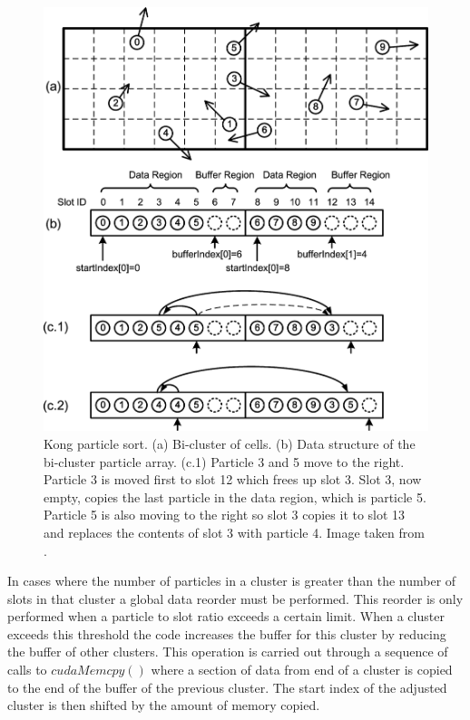 \begin{figure}
\begin{center}
\includegraphics[width=5in]{design/kong_sort.png}
\end{center}
\caption{Kong particle sort. (a) Bi-cluster of cells. (b) Data structure of the bi-cluster particle array. (c.1) Particle 3 and 5 move to the right. Particle 3 is moved first to slot 12 which frees up slot 3. Slot 3, now empty, copies the last particle in the data region, which is particle 5. Particle 5 is also moving to the right so slot 3 copies it to slot 13 and replaces the contents of slot 3 with particle 4. Image taken from \cite{Kong2011}.}
\label{fig:kong_sort}
\end{figure}

	In cases where the number of particles in a cluster is greater than the number of slots in that cluster a global data reorder must be performed. This reorder is only performed when a particle to slot ratio exceeds a certain limit. When a cluster exceeds this threshold the code increases the buffer for this cluster by reducing the buffer of other clusters. This operation is carried out through a sequence of calls to $cudaMemcpy()$ where a section of data from end of a cluster is copied to the end of the buffer of the previous cluster. The start index of the adjusted cluster is then shifted by the amount of memory copied. \cite{Kong2011}

